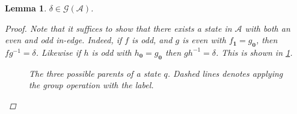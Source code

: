 \documentclass[12pt, letterpaper]{article}
\newcommand{\A}{\mathcal A}
\newcommand{\ch}[1]{\mathbf{#1}}
\newcommand{\res}[2]{{{#1}_{\ch{#2}}}}
\newcommand{\gp}{\mathcal G}
\newtheorem{lemma}[thm]{Lemma}
\begin{document}
\begin{lemma}\label{lemma:delta}
    $\delta \in \gp(\A)$.
    \begin{proof}
        Note that it suffices to show that there exists a state in $\A$ with
        both an even and odd in-edge. Indeed, if $f$ is odd, and $g$ is even
        with $\res{f}{1} = \res{g}{0}$, then $fg^{-1} = \delta$.  Likewise if
        $h$ is odd with $\res{h}{0} = \res{g}{0}$ then $gh^{-1} = \delta$.
        This is shown in \cref{fig:delta-diagram}.
        \begin{figure}[h]
            \centering
            \caption{The three possible parents of a state $q$.
            Dashed lines denotes applying the group operation with the
            label.}
            \label{fig:delta-diagram}
        \end{figure}


\end{proof}
\end{lemma}
\end{document}
